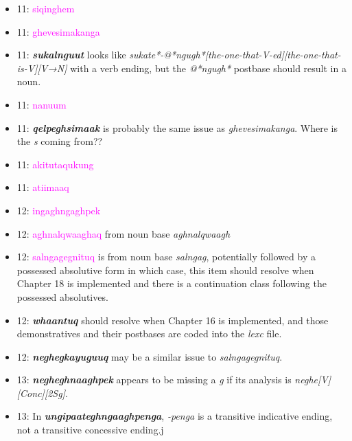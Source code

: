 \documentclass{article}
\begin{document}
\begin{itemize}
\item 11: \textcolor{magenta}{siqinghem}

\item 11: \textcolor{magenta}{ghevesimakanga}

\item 11: \textit{\textbf{sukalnguut}} looks like \textit{sukate*-@*ngugh*[the-one-that-V-ed][the-one-that-is-V][V→N]} with a verb ending, but the \textit{@*ngugh*} postbase should result in a noun.

\item 11: \textcolor{magenta}{nanuum}

\item 11: \textit{\textbf{qelpeghsimaak}} is probably the same issue as \textit{ghevesimakanga}.
%
Where is the \textit{s} coming from??

\item 11: \textcolor{magenta}{akitutaqukung}

\item 11: \textcolor{magenta}{atiimaaq}

\item 12: \textcolor{magenta}{ingaghngaghpek}

\item 12: \textcolor{magenta}{aghnalqwaaghaq} from noun base \textit{aghnalqwaagh}

\item 12: \textcolor{magenta}{salngagegnituq} is from noun base \textit{salngag}, potentially followed by a possessed absolutive form in which case, this item should resolve when Chapter 18 is implemented and there is a continuation class following the possessed absolutives.

\item 12: \textit{\textbf{whaantuq}} should resolve when Chapter 16 is implemented, and those demonstratives and their postbases are coded into the \textit{lexc} file.

\item 12: \textit{\textbf{neghegkayuguuq}} may be a similar issue to \textit{salngagegnituq}.

\item 13: \textit{\textbf{negheghnaaghpek}} appears to be missing a \textit{g} if its analysis is \textit{neghe[V][Conc][2Sg]}.

\item 13: In \textit{\textbf{ungipaateghngaaghpenga}}, \textit{-penga} is a transitive indicative ending, not a transitive concessive ending.j


\end{itemize}
\end{document}
